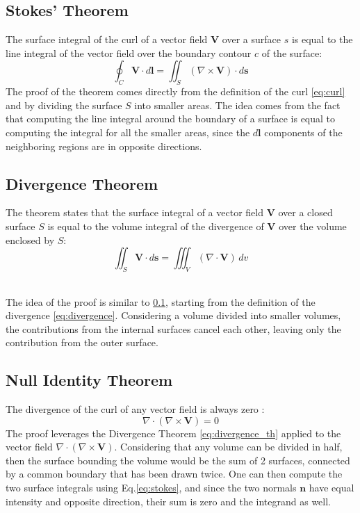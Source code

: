 \documentclass[main]{subfiles}
\begin{document}
\subsection{Stokes' Theorem} \label{Stokes' Theorem}
The surface integral of the curl of a vector field \(\mathbf{V}\) over a surface 
\( s \) is equal to the line integral of the vector field over the boundary 
contour \( c \) of the surface:
\begin{equation}
\oint_C \mathbf{V} \cdot d\mathbf{l} = \iint_S (\nabla \times \mathbf{V}) \cdot 
d\mathbf{s}
\label{eq:stokes}
\end{equation}
The proof of the theorem comes directly from the definition of the curl 
\eqref{eq:curl} and by dividing the surface $S$ into smaller areas. The idea comes 
from the fact that computing the line integral around the boundary of a surface 
is equal to computing the integral for all the smaller areas, since the 
\(d\mathbf{l}\) components of the neighboring regions are in opposite 
directions.

\subsection{Divergence Theorem}
The theorem states that the surface integral of a vector field \(\mathbf{V}\) 
over a closed surface \(S\) is equal to the volume integral of the divergence of 
\(\mathbf{V}\) over the volume enclosed by \(S\):
\begin{equation}
\iint_S\mathbf{V} \cdot d\mathbf{s} = \iiint_V (\nabla \cdot \mathbf{V}) \, dv
\label{eq:divergence_th}
\end{equation}

\noindent\\
The idea of the proof is similar to \ref{Stokes' Theorem}, starting from the 
definition of the divergence \eqref{eq:divergence}. Considering a volume divided 
into smaller volumes, the contributions from the internal surfaces cancel each 
other, leaving only the contribution from the outer surface.

\subsection{Null Identity Theorem}
The divergence of the curl of any vector field is always zero \cite{book-magnetism}:
\begin{equation}
\nabla \cdot (\nabla \times \mathbf{V}) = 0 
\label{eq:null}
\end{equation}
The proof leverages the Divergence Theorem \eqref{eq:divergence_th} applied to the 
vector field \(\nabla \cdot (\nabla \times \mathbf{V})\). Considering that any 
volume can be divided in half, then the surface bounding the volume would be the 
sum of 2 surfaces, connected by a common boundary that has been drawn twice. One 
can then compute the two surface integrals using Eq.\ref{eq:stokes}, and since the 
two normals \(\mathbf{n}\) have equal intensity and opposite direction, their sum 
is zero and the integrand as well.
\end{document}
